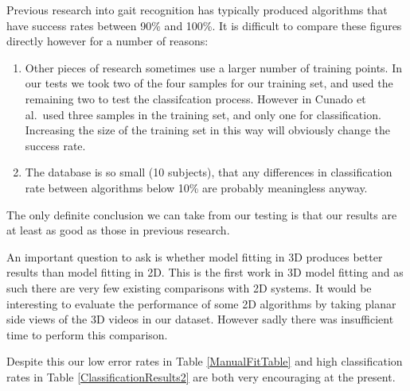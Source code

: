 Previous research into gait recognition has typically produced algorithms that have success rates between 90\% and 100\%.
It is difficult to compare these figures directly however for a number of reasons:

\begin{enumerate}
	\item Other pieces of research sometimes use a larger number of training points.
		In our tests we took two of the four samples for our training set, and used the remaining two to test the classifcation process.
		However in \cite{GaitModels} Cunado et al.\ used three samples in the training set, and only one for classification.
		Increasing the size of the training set in this way will obviously change the success rate.
	\item The database is so small (10 subjects), that any differences in classification rate between algorithms below 10\% are probably meaningless anyway.
\end{enumerate}

The only definite conclusion we can take from our testing is that our results are at least as good as those in previous research.

\bigskip
\noindent An important question to ask is whether model fitting in 3D produces better results than model fitting in 2D.
This is the first work in 3D model fitting and as such there are very few existing comparisons with 2D systems.
It would be interesting to evaluate the performance of some 2D algorithms by taking planar side views of the 3D videos in our dataset.
However sadly there was insufficient time to perform this comparison.

Despite this our low error rates in Table \ref{ManualFitTable} and high classification rates in Table \ref{ClassificationResults2} are both very encouraging at the present.
